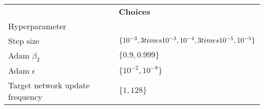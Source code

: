 \begin{tabular}{ll}
 & \bfseries Choices \\
Hyperparameter &  \\
Step size & $\{10^{-3}, 3 \\times 10^{-3}, 10^{-4}, 3 \\times 10^{-5}, 10^{-5}\}$ \\
Adam $\beta_2$ & $\{0.9, 0.999\}$ \\
Adam $\epsilon$ & $\{10^{-2}, 10^{-8}\}$ \\
Target network update frequency & $\{1, 128\}$ \\
\end{tabular}
